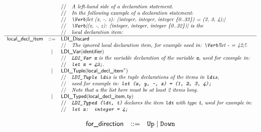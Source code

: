 \documentclass{book}
\begin{document}
\[
\begin{array}{rcl}
  & & \ASTComment{A left-hand side of a declaration statement.}\\
  & & \ASTComment{In the following example of a declaration statement:}\\
  & & \ASTComment{\Verb|let (x, -, z): (integer, integer, integer \{0..32\}) = (2, 3, 4);|}\\
  & & \ASTComment{\Verb|(x, -, z): (integer, integer, integer \{0..32\})| is the}\\
  & & \ASTComment{local declaration item:}\\
  \hline
\localdeclitem &::=
    & \LDIDiscard\\
  & & \ASTComment{The ignored local declaration item, for example used in: \Verb!let - = 42;!.}\\
  &|& \LDIVar(\identifier)\\
  & & \ASTComment{\texttt{LDI\_Var x} is the variable declaration of the variable \texttt{x}, used for example in:}\\
  & & \ASTComment{\texttt{let x = 42;}.}\\
  &|& \LDITuple(\localdeclitem^*)\\
  & & \ASTComment{\texttt{LDI\_Tuple ldis} is the tuple declarations of the items in \texttt{ldis},}\\
  & & \ASTComment{used for example in: \texttt{let (x, y, -, z) = (1, 2, 3, 4);}}\\
  & & \ASTComment{Note that a the list here must be at least 2 items long.}\\
  &|& \LDITyped(\localdeclitem, \ty)\\
  & & \ASTComment{\texttt{LDI\_Typed (ldi, t)} declares the item \texttt{ldi} with type \texttt{t}, used for example in:} \\
  & & \ASTComment{\texttt{let x: integer = 4;}}
\end{array}
\]

\[
\begin{array}{rcl}
\textsf{for\_direction} &::=& \texttt{Up} \;|\; \texttt{Down}\\
\end{array}
\]
\end{document}

